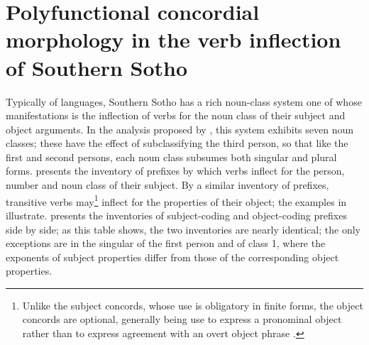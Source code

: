 \documentclass[output=paper,
modfonts
]{LSP/langsci}
\begin{document}
\section{Polyfunctional concordial morphology in the verb inflection of Southern Sotho}
Typically of  languages, Southern Sotho has a rich noun\nobreakdash-class system one of whose manifestations is the inflection of verbs for the noun class of their subject and object arguments.  In the analysis proposed by  \citet{doke1985}, this system exhibits seven noun classes; these have the effect of subclassifying the third person, so that like the first and second persons, each noun class subsumes both singular and plural forms.   presents the inventory of prefixes by which verbs inflect for the person, number and noun class of their subject.  By a similar inventory of prefixes, transitive verbs may\footnote{Unlike the subject concords, whose use is obligatory in finite forms, the object concords are optional, generally being use to express a pronominal object rather than to express agreement with an overt object phrase \citep[242]{doke1985}.} inflect for the properties of their object; the examples in  illustrate.   presents the inventories of subject\nobreakdash-coding and object\nobreakdash-coding prefixes side by side; as this table shows, the two inventories are nearly identical; the only exceptions are in the singular of the first person and of class 1, where the exponents of subject properties differ from those of the corresponding object properties.
\end{document}

